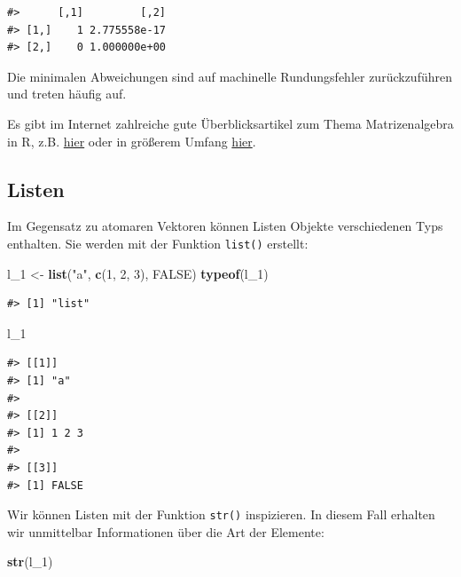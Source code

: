 \documentclass[]{tufte-book}
\newenvironment{Shaded}{}{}
\newcommand{\KeywordTok}[1]{\textcolor[rgb]{0.00,0.44,0.13}{\textbf{#1}}}
\newcommand{\DecValTok}[1]{\textcolor[rgb]{0.25,0.63,0.44}{#1}}
\newcommand{\StringTok}[1]{\textcolor[rgb]{0.25,0.44,0.63}{#1}}
\newcommand{\OtherTok}[1]{\textcolor[rgb]{0.00,0.44,0.13}{#1}}
\newcommand{\NormalTok}[1]{#1}
\begin{document}
\begin{verbatim}
#>      [,1]         [,2]
#> [1,]    1 2.775558e-17
#> [2,]    0 1.000000e+00
\end{verbatim}

Die minimalen Abweichungen sind auf machinelle Rundungsfehler
zurückzuführen und treten häufig auf.

Es gibt im Internet zahlreiche gute Überblicksartikel zum Thema
Matrizenalgebra in R, z.B.
\href{https://www.statmethods.net/advstats/matrix.html}{hier} oder in
größerem Umfang
\href{https://www.math.uh.edu/~jmorgan/Math6397/day13/LinearAlgebraR-Handout.pdf}{hier}.

\subsection{Listen}\label{listen}

Im Gegensatz zu atomaren Vektoren können Listen Objekte verschiedenen
Typs enthalten. Sie werden mit der Funktion \texttt{list()} erstellt:

\begin{Shaded}
\begin{Highlighting}[]
\NormalTok{l_}\DecValTok{1}\NormalTok{ <-}\StringTok{ }\KeywordTok{list}\NormalTok{(}\StringTok{"a"}\NormalTok{, }\KeywordTok{c}\NormalTok{(}\DecValTok{1}\NormalTok{, }\DecValTok{2}\NormalTok{, }\DecValTok{3}\NormalTok{), }\OtherTok{FALSE}\NormalTok{)}
\KeywordTok{typeof}\NormalTok{(l_}\DecValTok{1}\NormalTok{)}
\end{Highlighting}
\end{Shaded}

\begin{verbatim}
#> [1] "list"
\end{verbatim}

\begin{Shaded}
\begin{Highlighting}[]
\NormalTok{l_}\DecValTok{1}
\end{Highlighting}
\end{Shaded}

\begin{verbatim}
#> [[1]]
#> [1] "a"
#> 
#> [[2]]
#> [1] 1 2 3
#> 
#> [[3]]
#> [1] FALSE
\end{verbatim}

Wir können Listen mit der Funktion \texttt{str()} inspizieren. In diesem
Fall erhalten wir unmittelbar Informationen über die Art der Elemente:

\begin{Shaded}
\begin{Highlighting}[]
\KeywordTok{str}\NormalTok{(l_}\DecValTok{1}\NormalTok{)}
\end{Highlighting}
\end{Shaded}
\end{document}
